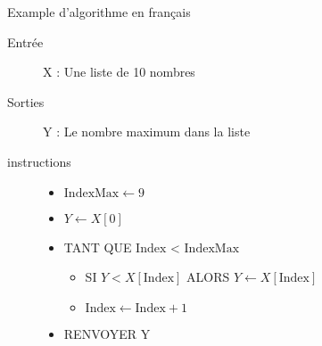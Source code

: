 \begin{frame}{Example d'algorithme en français}
    \begin{description}
        \item [Entrée] X : Une liste de 10 nombres
        \item [Sorties] Y : Le nombre maximum dans la liste 
        \item [instructions]
        \begin{itemize}
            \item $\text{IndexMax} \leftarrow 9$
            \item $Y \leftarrow X[0]$ 
            \item TANT QUE $\text{Index}$ < $\text{IndexMax}$
            \begin{itemize}
                \item SI $Y < X[\text{Index}]$ ALORS $Y \leftarrow X[\text{Index}]$ 
                \item $\text{Index} \leftarrow \text{Index} + 1$
            \end{itemize}
            \item RENVOYER Y
        \end{itemize}
    \end{description}
\end{frame}



